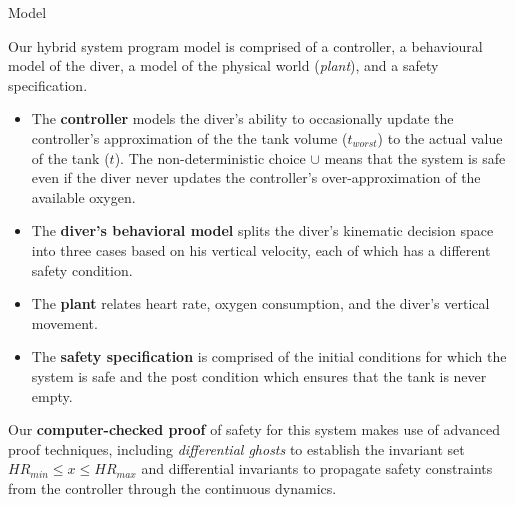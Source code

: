 \documentclass[final]{beamer}
\theoremstyle{definition}
\begin{document}
\begin{frame}[fragile]
\begin{textblock}{51}
\begin{block}{Model}
\begin{multicols}{2}
\columnbreak

Our hybrid system program model is comprised of a controller, a behavioural model of the diver, a model of the physical world (\textit{plant}), and a safety specification.
\hfill \break

\begin{itemize}
    \item The \textbf{controller} models the diver's ability to occasionally update the controller's approximation of the the tank volume ($t_{worst}$) to the actual value of the tank ($t$). The non-deterministic choice $\cup$ means that the system is safe even if the diver never updates the controller's over-approximation of the available oxygen.
    \hfill \break 
    \item The \textbf{diver's behavioral model} splits the diver's kinematic decision space into three cases based on his vertical velocity, each of which has a different safety condition. 
    \hfill \break 
    \item The \textbf{plant} relates heart rate, oxygen consumption, and the diver's vertical movement. 
    \hfill \break 
    \item The \textbf{safety specification} is comprised of the initial conditions for which the system is safe and the post condition which ensures that the tank is never empty. 
    
\end{itemize}
\hfill \break 
Our \textbf{computer-checked proof} of safety for this system makes use of advanced proof techniques, including \emph{differential ghosts} to establish the invariant set $HR_{min} \le x \le HR_{max}$ and differential invariants to propagate safety constraints from the controller through the continuous dynamics.



  




\end{multicols}
\end{block}
\end{textblock}
\end{frame}
\end{document}
